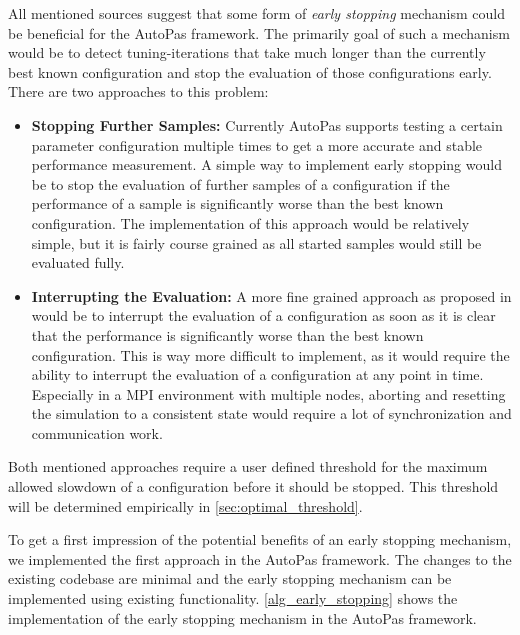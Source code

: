 \documentclass[conference]{IEEEtran}
\begin{document}
All mentioned sources suggest that some form of \textit{early stopping} mechanism could be beneficial for the AutoPas framework. The primarily goal of such a mechanism would be to detect tuning-iterations that take much longer than the currently best known configuration and stop the evaluation of those configurations early. There are two approaches to this problem:

\begin{itemize}
    \item \textbf{Stopping Further Samples:} Currently AutoPas supports testing a certain parameter configuration multiple times to get a more accurate and stable performance measurement. A simple way to implement early stopping would be to stop the evaluation of further samples of a configuration if the performance of a sample is significantly worse than the best known configuration. The implementation of this approach would be relatively simple, but it is fairly course grained as all started samples would still be evaluated fully.
    \item \textbf{Interrupting the Evaluation:} A more fine grained approach as proposed in \cite{endreport.pdf} would be to interrupt the evaluation of a configuration as soon as it is clear that the performance is significantly worse than the best known configuration. This is way more difficult to implement, as it would require the ability to interrupt the evaluation of a configuration at any point in time. Especially in a MPI environment with multiple nodes, aborting and resetting the simulation to a consistent state would require a lot of synchronization and communication work.
\end{itemize}

Both mentioned approaches require a user defined threshold for the maximum allowed slowdown of a configuration before it should be stopped. This threshold will be determined empirically in \autoref{sec:optimal_threshold}.

To get a first impression of the potential benefits of an early stopping mechanism, we implemented the first approach in the AutoPas framework. The changes to the existing codebase are minimal and the early stopping mechanism can be implemented using existing functionality. \autoref{alg_early_stopping} shows the implementation of the early stopping mechanism in the AutoPas framework.

\newpage
\end{document}
